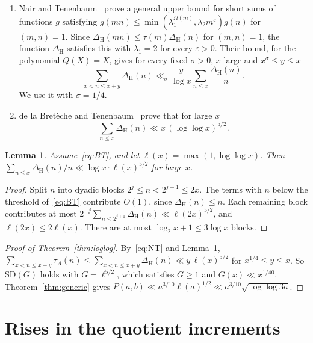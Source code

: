 \documentclass[11pt]{amsart}
\newtheorem{lemma}[theorem]{Lemma}
\theoremstyle{definition}
\theoremstyle{remark}
\begin{document}
\begin{enumerate}
\item[(NT)] Nair and Tenenbaum~\cite{NT} prove a general upper bound for short sums of
functions $g$ satisfying $g(mn)\le\min(\lambda_1^{\Omega(m)},\lambda_2m^\varepsilon)g(n)$ for $(m,n)=1$. Since
$\Delta_{\mathrm H}(mn)\le\tau(m)\Delta_{\mathrm H}(n)$ for $(m,n)=1$, the function
$\Delta_{\mathrm H}$ satisfies this with $\lambda_1=2$ for every $\varepsilon>0$. Their bound, for the
polynomial $Q(X)=X$, gives for every fixed $\sigma>0$, $x$ large and $x^{\sigma}\le y\le x$
\begin{equation}\label{eq:NT}
\sum_{x<n\le x+y}\Delta_{\mathrm H}(n)\ll_\sigma\frac{y}{\log x}\sum_{n\le x}\frac{\Delta_{\mathrm H}(n)}{n}.
\end{equation}
We use it with $\sigma=1/4$.
\item[(BT)] de la Bret\`eche and Tenenbaum~\cite[Theorem~1.1]{BT} prove that for large $x$
\begin{equation}\label{eq:BT}
\sum_{n\le x}\Delta_{\mathrm H}(n)\ll x\,(\log\log x)^{5/2}.
\end{equation}
\end{enumerate}

\begin{lemma}\label{lem:partial}
Assume~\eqref{eq:BT}, and let $\ell(x)=\max(1,\log\log x)$. Then
$\sum_{n\le x}\Delta_{\mathrm H}(n)/n\ll\log x\cdot\ell(x)^{5/2}$ for large $x$.
\end{lemma}

\begin{proof}
Split $n$ into dyadic blocks $2^j\le n<2^{j+1}\le 2x$. The terms with $n$ below the threshold
of~\eqref{eq:BT} contribute $O(1)$, since $\Delta_{\mathrm H}(n)\le n$. Each remaining block
contributes at most $2^{-j}\sum_{n\le 2^{j+1}}\Delta_{\mathrm H}(n)\ll\ell(2x)^{5/2}$, and
$\ell(2x)\le2\ell(x)$. There are at most $\log_2x+1\le 3\log x$ blocks.
\end{proof}

\begin{proof}[Proof of Theorem~\ref{thm:loglog}]
By~\eqref{eq:NT} and Lemma~\ref{lem:partial}, $\sum_{x<n\le x+y}\tau_A(n)\le
\sum_{x<n\le x+y}\Delta_{\mathrm H}(n)\ll y\,\ell(x)^{5/2}$ for $x^{1/4}\le y\le x$. So
$\mathrm{SD}(G)$ holds with $G=\ell^{5/2}$, which satisfies $G\ge1$ and $G(x)\ll x^{1/40}$.
Theorem~\ref{thm:generic} gives $P(a,b)\ll a^{3/10}\ell(a)^{1/2}\ll a^{3/10}\sqrt{\log\log3a}$.
\end{proof}

\section{Rises in the quotient increments}\label{sec:rises}
\end{document}
